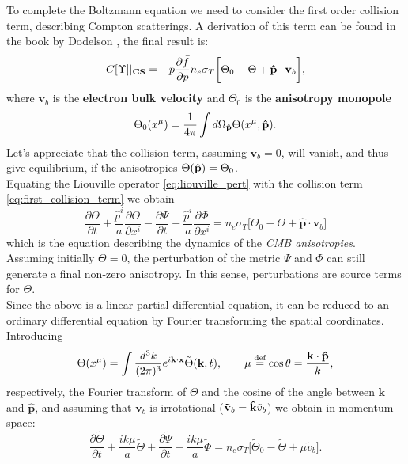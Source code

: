 To complete the Boltzmann equation we need to consider the first order collision term, describing Compton scatterings. A derivation of this term can be found in the book by Dodelson \cite{dodelson}, the final result is:
\begin{equation} \label{eq:first_collision_term}
    C[\Upsilon]|_{\text{\textbf{CS}}} = -p\frac{\partial\bar f}{\partial p} n_{e}\sigma_T\bigg[\Theta_0-\Theta+\mathbf{\hat{p}}\cdot\mathbf{v}_{b}\bigg],
\end{equation}
where $\mathbf{v}_{b}$ is the \textbf{electron bulk velocity} and $\Theta_0$ is the \textbf{anisotropy monopole}
$$\Theta_0(x^\mu)=\frac{1}{4\pi}\int d\Omega_{\mathbf{\hat{p}}} \Theta(x^\mu,\mathbf{\hat{p}}).$$
Let's appreciate that the collision term, assuming $\mathbf{v}_b=0$, will vanish, and thus give equilibrium, if the anisotropies $\Theta(\mathbf{\hat{p}})=\Theta_0$.\\
Equating the Liouville operator \eqref{eq:liouville_pert} with the collision term \eqref{eq:first_collision_term} we obtain
\begin{equation}\label{eq:phot_boltzmann_pert}
    \frac{\partial \Theta}{\partial t}+\frac{\hat p^i}{a}\frac{\partial \Theta}{\partial x^i}-\frac{\partial\Psi}{\partial t}+\frac{\hat p^i}{a}\frac{\partial \Phi}{\partial x^i}=n_{e}\sigma_T\bigg[\Theta_0-\Theta+\mathbf{\hat{p}}\cdot\mathbf{v}_{b}\bigg]
\end{equation}
which is the equation describing the dynamics of the \emph{CMB anisotropies}. Assuming initially $\Theta=0$, the perturbation of the metric $\Psi$ and $\Phi$ can still generate a final non-zero anisotropy. In this sense, perturbations are source terms for $\Theta$.\\
Since the above is a linear partial differential equation, it can be reduced to an ordinary differential equation by Fourier transforming the spatial coordinates.
Introducing 
$$\Theta(x^\mu) = \int \frac{d^3k}{(2\pi)^3}e^{i\mathbf{k}\cdot\mathbf{x}}\tilde\Theta(\mathbf{k},t),\qquad \mu\stackrel{\text{def}}{=} \cos\theta=\frac{\mathbf{k}\cdot\mathbf{\hat{p}}}{k},$$respectively, the Fourier transform of $\Theta$ and the cosine of the angle between $\mathbf{k}$ and $\mathbf{\hat{p}}$, and assuming that $\mathbf{v}_b$ is irrotational ($\mathbf{\tilde v}_b=\mathbf{\hat{k}}\tilde v_b$) we obtain in momentum space:
\begin{equation*}
    \frac{\partial \tilde\Theta}{\partial t} +\frac{ik\mu}{a}\tilde\Theta+\frac{\partial \tilde\Psi}{\partial t}+\frac{ik\mu}{a}\tilde\Phi=n_e \sigma_T\Bigg[\tilde\Theta_0-\tilde\Theta+\mu\tilde v_b\Bigg].
\end{equation*}
